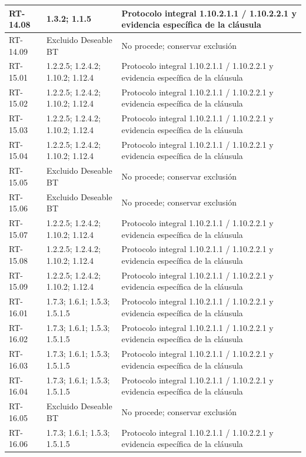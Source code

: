 \begin{longtable}{L{23mm}L{46mm}L{72mm}}
RT-14.08 & 1.3.2; 1.1.5 & Protocolo integral 1.10.2.1.1 / 1.10.2.2.1 y evidencia específica de la cláusula\\\hline
RT-14.09 & Excluido Deseable BT & No procede; conservar exclusión\\\hline
RT-15.01 & 1.2.2.5; 1.2.4.2; 1.10.2; 1.12.4 & Protocolo integral 1.10.2.1.1 / 1.10.2.2.1 y evidencia específica de la cláusula\\\hline
RT-15.02 & 1.2.2.5; 1.2.4.2; 1.10.2; 1.12.4 & Protocolo integral 1.10.2.1.1 / 1.10.2.2.1 y evidencia específica de la cláusula\\\hline
RT-15.03 & 1.2.2.5; 1.2.4.2; 1.10.2; 1.12.4 & Protocolo integral 1.10.2.1.1 / 1.10.2.2.1 y evidencia específica de la cláusula\\\hline
RT-15.04 & 1.2.2.5; 1.2.4.2; 1.10.2; 1.12.4 & Protocolo integral 1.10.2.1.1 / 1.10.2.2.1 y evidencia específica de la cláusula\\\hline
RT-15.05 & Excluido Deseable BT & No procede; conservar exclusión\\\hline
RT-15.06 & Excluido Deseable BT & No procede; conservar exclusión\\\hline
RT-15.07 & 1.2.2.5; 1.2.4.2; 1.10.2; 1.12.4 & Protocolo integral 1.10.2.1.1 / 1.10.2.2.1 y evidencia específica de la cláusula\\\hline
RT-15.08 & 1.2.2.5; 1.2.4.2; 1.10.2; 1.12.4 & Protocolo integral 1.10.2.1.1 / 1.10.2.2.1 y evidencia específica de la cláusula\\\hline
RT-15.09 & 1.2.2.5; 1.2.4.2; 1.10.2; 1.12.4 & Protocolo integral 1.10.2.1.1 / 1.10.2.2.1 y evidencia específica de la cláusula\\\hline
RT-16.01 & 1.7.3; 1.6.1; 1.5.3; 1.5.1.5 & Protocolo integral 1.10.2.1.1 / 1.10.2.2.1 y evidencia específica de la cláusula\\\hline
RT-16.02 & 1.7.3; 1.6.1; 1.5.3; 1.5.1.5 & Protocolo integral 1.10.2.1.1 / 1.10.2.2.1 y evidencia específica de la cláusula\\\hline
RT-16.03 & 1.7.3; 1.6.1; 1.5.3; 1.5.1.5 & Protocolo integral 1.10.2.1.1 / 1.10.2.2.1 y evidencia específica de la cláusula\\\hline
RT-16.04 & 1.7.3; 1.6.1; 1.5.3; 1.5.1.5 & Protocolo integral 1.10.2.1.1 / 1.10.2.2.1 y evidencia específica de la cláusula\\\hline
RT-16.05 & Excluido Deseable BT & No procede; conservar exclusión\\\hline
RT-16.06 & 1.7.3; 1.6.1; 1.5.3; 1.5.1.5 & Protocolo integral 1.10.2.1.1 / 1.10.2.2.1 y evidencia específica de la cláusula\\\hline

\end{longtable}
